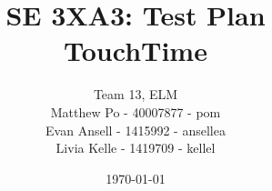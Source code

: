 % 


% 

\documentclass[12pt, titlepage]{article}

\usepackage{booktabs}
\usepackage{tabularx}
\usepackage{hyperref}
\usepackage{float}
\usepackage[normalem]{ulem}
\hypersetup{
    colorlinks,
    citecolor=black,
    filecolor=black,
    linkcolor=red,
    urlcolor=blue
}
\usepackage[round]{natbib}

\title{SE 3XA3: Test Plan\\TouchTime}

\author{Team 13, ELM
		\\ Matthew Po - 40007877 - pom
		\\ Evan Ansell - 1415992 - ansellea
		\\ Livia Kelle - 1419709 - kellel
}

\date{\today}

%



\maketitle

\tableofcontents
\listoftables

